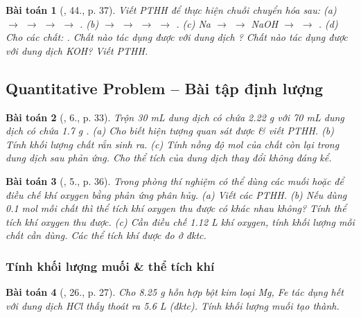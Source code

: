 \documentclass{article}
\newtheorem{baitoan}{Bài toán}
\begin{document}
\begin{baitoan}[\cite{An_350_BT_Hoa_Hoc_9}, 44., p. 37]
	Viết PTHH để thực hiện chuỗi chuyển hóa sau: (a) \emph{ $\to$  $\to$  $\to$  $\to$ }. (b) \emph{ $\to$  $\to$  $\to$  $\to$ }. (c) \emph{Na $\to$  $\to$ NaOH $\to$  $\to$ }. (d) Cho các chất: \emph{}. Chất nào tác dụng được với dung dịch \emph{}? Chất nào tác dụng được với dung dịch \emph{KOH}? Viết PTHH.
\end{baitoan}

\subsection{Quantitative Problem -- Bài tập định lượng}

\begin{baitoan}[\cite{SGK_Hoa_Hoc_9}, 6., p. 33]
	Trộn \emph{30 mL} dung dịch có chứa \emph{2.22 g } với \emph{70 mL} dung dịch có chứa \emph{1.7 g }. (a) Cho biết hiện tượng quan sát được \& viết PTHH. (b) Tính khối lượng chất rắn sinh ra. (c) Tính nồng độ mol của chất còn lại trong dung dịch sau phản ứng. Cho thể tích của dung dịch thay đổi không đáng kể.
\end{baitoan}

\begin{baitoan}[\cite{SGK_Hoa_Hoc_9}, 5., p. 36]
	Trong phòng thí nghiệm có thể dùng các muối \emph{} hoặc \emph{} để điều chế khí oxygen bằng phản ứng phân hủy. (a) Viết các PTHH. (b) Nếu dùng \emph{0.1 mol} mỗi chất thì thể tích khí oxygen thu được có khác nhau không? Tính thể tích khí oxygen thu được. (c) Cần điều chế \emph{1.12 L} khí oxygen, tính khối lượng mỗi chất cần dùng. Các thể tích khí được đo ở đktc.
\end{baitoan}

\subsubsection{Tính khối lượng muối \& thể tích khí }

\begin{baitoan}[\cite{An_350_BT_Hoa_Hoc_9}, 26., p. 27]
	Cho \emph{8.25 g} hỗn hợp bột kim loại \emph{Mg, Fe} tác dụng hết với dung dịch \emph{HCl} thấy thoát ra \emph{5.6 L } (đktc). Tính khối lượng muối tạo thành.
\end{baitoan}
\end{document}
